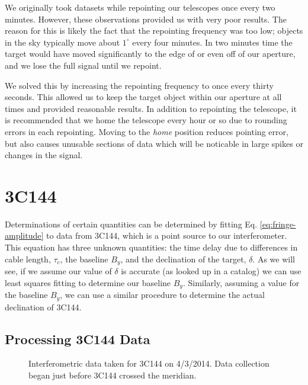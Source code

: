 \documentclass[12pt]{article}
\begin{document}
We originally took datasets while repointing our telescopes once every two minutes. However, these observations provided us with very poor results. The reason for this is likely the fact that the repointing frequency was too low; objects in the sky typically move about $1^\circ$ every four minutes. In two minutes time the target would have moved significantly to the edge of or even off of our aperture, and we lose the full signal until we repoint. 

We solved this by increasing the repointing frequency to once every thirty seconds. This allowed us to keep the target object within our aperture at all times and provided reasonable results. In addition to repointing the telescope, it is recommended that we home the telescope every hour or so due to rounding errors in each repointing. Moving to the \textit{home} position reduces pointing error, but also causes unusable sections of data which will be noticable in large spikes or changes in the signal.

\section{3C144}
Determinations of certain quantities can be determined by fitting Eq. \ref{eq:fringe-amplitude} to data from 3C144, which is a point source to our interferometer. This equation has three unknown quantities: the time delay due to differences in cable length, $\tau_c$, the baseline $B_y$, and the declination of the target, $\delta$. As we will see, if we assume our value of $\delta$ is accurate (as looked up in a catalog) we can use least squares fitting to determine our baseline $B_y$. Similarly, assuming a value for the baseline $B_y$, we can use a similar procedure to determine the actual declination of 3C144.

\subsection{Processing 3C144 Data}

\begin{figure}[H]
\caption[SODUMB]{Interferometric data taken for 3C144 on 4/3/2014. Data collection began just before 3C144 crossed the meridian.}
\label{fig:original}
\end{figure}
\end{document}
